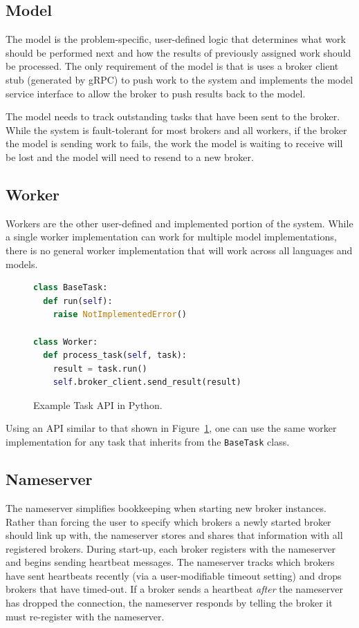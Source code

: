 \documentclass[conference]{IEEEtran}
\begin{document}
\subsection{Model}
The model is the problem-specific, user-defined logic that determines what work
should be performed next and how the results of previously assigned work should
be processed. The only requirement of the model is that is uses a broker client
stub (generated by gRPC) to push work to the system and implements the model
service interface to allow the broker to push results back to the model.

The model needs to track outstanding tasks that have been sent to the broker.
While the system is fault-tolerant for most brokers and all workers, if the
broker the model is sending work to fails, the work the model is waiting to
receive will be lost and the model will need to resend to a new broker.

\subsection{Worker}
Workers are the other user-defined and implemented portion of the system. While
a single worker implementation can work for multiple model implementations, there
is no general worker implementation that will work across all languages and models.

\begin{figure}
  \begin{lstlisting}[language=python]
class BaseTask:
  def run(self):
    raise NotImplementedError()

class Worker:
  def process_task(self, task):
    result = task.run()
    self.broker_client.send_result(result)
  \end{lstlisting}
  \caption{Example Task API in Python.}\label{fig:python-api}
\end{figure}

Using an API similar to that shown in Figure~\ref{fig:python-api}, one can use
the same worker implementation for any task that inherits from the \texttt{BaseTask}
class.

\subsection{Nameserver}
The nameserver simplifies bookkeeping when starting new broker instances.
Rather than forcing the user to specify which brokers a newly started broker
should link up with, the nameserver stores and shares that information with
all registered brokers. During start-up, each broker registers with the nameserver
and begins sending heartbeat messages. The nameserver tracks which brokers have
sent heartbeats recently (via a user-modifiable timeout setting) and drops brokers
that have timed-out. If a broker sends a heartbeat \emph{after} the nameserver has
dropped the connection, the nameserver responds by telling the broker it must
re-register with the nameserver.
\end{document}
